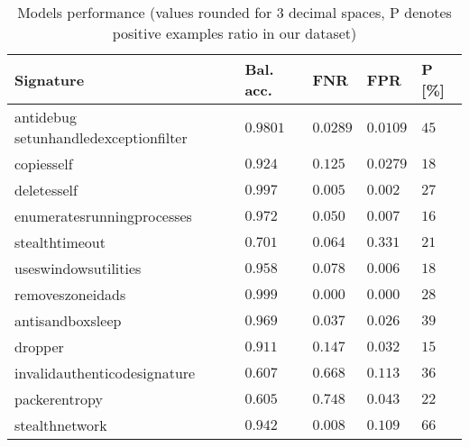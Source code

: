 \begin{table}[h]
  \centering
  \caption{Models performance (values rounded for 3 decimal spaces, P denotes positive examples ratio in our dataset)}
  \begin{tabular}{lllll}
      \toprule
      \textbf{Signature} &
      \textbf{Bal. acc.} &
      \textbf{FNR} &
      \textbf{FPR} &
      \textbf{P [\%]}
      \\
      \midrule
      antidebug setunhandledexceptionfilter & $0.9801$ & $0.0289$ & $0.0109$ & $45$ \\
      \midrule
      copiesself & $0.924$ & $0.125$ & $0.0279$ & $18$ \\
      \midrule
      deletesself & $0.997$ & $0.005$ & $0.002$ & $27$ \\
      \midrule
      enumeratesrunningprocesses & $0.972$ & $0.050$ & $0.007$ & $16$ \\
      \midrule
      stealthtimeout & $0.701$ & $0.064$ & $0.331$ & $21$ \\
      \midrule
      useswindowsutilities & $0.958$ & $0.078$ & $0.006$ & $18$ \\
      \midrule
      removeszoneidads & $0.999$ & $0.000$ & $0.000$ & $28$ \\
      \midrule[0.3pt]
      \midrule[0.3pt]
      antisandboxsleep & $0.969$ & $0.037$ & $0.026$ & $39$ \\
      \midrule
      dropper & $0.911$ & $0.147$ & $0.032$ & $15$ \\
      \midrule
      invalidauthenticodesignature & $0.607$ & $0.668$ & $0.113$ & $36$ \\
      \midrule
      packerentropy & $0.605$ & $0.748$ & $0.043$ & $22$ \\
      \midrule
      stealthnetwork & $0.942$ & $0.008$ & $0.109$ & $66$ \\
      \bottomrule
  \end{tabular}
  \label{tab:models_res}
\end{table}

